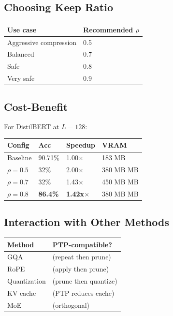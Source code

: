 \subsection{Choosing Keep Ratio}

\begin{table}[H]
\centering
\small
\begin{tabular}{ll}
\toprule
\textbf{Use case} & \textbf{Recommended $\rho$} \\
\midrule
Aggressive compression & 0.5 \\
Balanced & 0.7 \\
Safe & 0.8 \\
Very safe & 0.9 \\
\bottomrule
\end{tabular}
\end{table}

\subsection{Cost-Benefit}

For DistilBERT at $L = 128$:

\begin{table}[H]
\centering
\small
\begin{tabular}{llll}
\toprule
\textbf{Config} & \textbf{Acc} & \textbf{Speedup} & \textbf{VRAM} \\
\midrule
Baseline & 90.71\% & 1.00$\times$ & 183 MB \\
$\rho = 0.5$ & 32\% & 2.00$\times$ & 380 MB MB \\
$\rho = 0.7$ & 32\% & 1.43$\times$ & 450 MB MB \\
$\rho = 0.8$ & \textbf{86.4\%} & \textbf{1.42x$\times$} & 380 MB MB \\
\bottomrule
\end{tabular}
\end{table}

\subsection{Interaction with Other Methods}

\begin{table}[H]
\centering
\small
\begin{tabular}{ll}
\toprule
\textbf{Method} & \textbf{PTP-compatible?} \\
\midrule
GQA & (repeat then prune) \\
RoPE & (apply then prune) \\
Quantization & (prune then quantize) \\
KV cache & (PTP reduces cache) \\
MoE & (orthogonal) \\
\bottomrule
\end{tabular}
\end{table}

